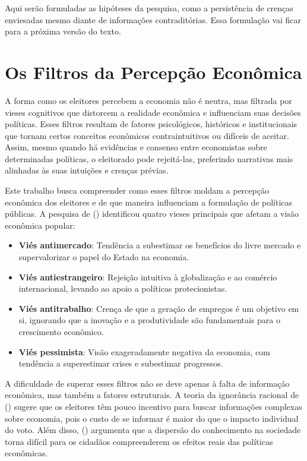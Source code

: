 Aqui serão formuladas as hipóteses da pesquisa, como a persistência de crenças enviesadas mesmo diante de informações contraditórias. Essa formulação vai ficar para a próxima versão do texto.

\section{Os Filtros da Percepção Econômica} %

A forma como os eleitores percebem a economia não é neutra, mas filtrada por vieses cognitivos que distorcem a realidade econômica e influenciam suas decisões políticas. Esses filtros resultam de fatores psicológicos, históricos e institucionais que tornam certos conceitos econômicos contraintuitivos ou difíceis de aceitar. Assim, mesmo quando há evidências e consenso entre economistas sobre determinadas políticas, o eleitorado pode rejeitá-las, preferindo narrativas mais alinhadas às suas intuições e crenças prévias.

Este trabalho busca compreender como esses filtros moldam a percepção econômica dos eleitores e de que maneira influenciam a formulação de políticas públicas. A pesquisa de  (\citeyear{The_Myth_of_the_Rational_Voter}) identificou quatro vieses principais que afetam a visão econômica popular:

\begin{itemize}
    \item \textbf{Viés antimercado}: Tendência a subestimar os benefícios do livre mercado e supervalorizar o papel do Estado na economia.
    \item \textbf{Viés antiestrangeiro}: Rejeição intuitiva à globalização e ao comércio internacional, levando ao apoio a políticas protecionistas.
    \item \textbf{Viés antitrabalho}: Crença de que a geração de empregos é um objetivo em si, ignorando que a inovação e a produtividade são fundamentais para o crescimento econômico.
    \item \textbf{Viés pessimista}: Visão exageradamente negativa da economia, com tendência a superestimar crises e subestimar progressos.
\end{itemize}

A dificuldade de superar esses filtros não se deve apenas à falta de informação econômica, mas também a fatores estruturais. A teoria da ignorância racional de  (\citeyear{downs1957economic}) sugere que os eleitores têm pouco incentivo para buscar informações complexas sobre economia, pois o custo de se informar é maior do que o impacto individual do voto. Além disso,  (\citeyear{hayek_knowledge_use}) argumenta que a dispersão do conhecimento na sociedade torna difícil para os cidadãos compreenderem os efeitos reais das políticas econômicas.

